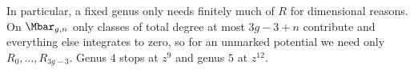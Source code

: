 \begin{rmk}
    In particular, a fixed genus only needs finitely much of \(R\) for dimensional reasons. On \(\Mbar_{g,n}\) only classes of total degree at most \(3g-3+n\) contribute and everything else integrates to zero, so for an unmarked potential we need only \(R_0, \ldots, R_{3g-3}\). Genus \(4\) stops at \(z^9\) and genus \(5\) at \(z^{12}\).
\end{rmk}

